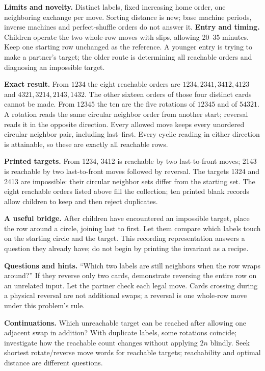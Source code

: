 \textbf{Limits and novelty.} Distinct labels, fixed increasing home order, one neighboring exchange per move. Sorting distance is new; base machine periods, inverse machines and perfect-shuffle orders do not answer it.
\newpage
{}
\textbf{Entry and timing.} Children operate the two whole-row moves with slips, allowing 20--35 minutes. Keep one starting row unchanged as the reference. A younger entry is trying to make a partner's target; the older route is determining all reachable orders and diagnosing an impossible target.

\textbf{Exact result.} From $1234$ the eight reachable orders are $1234,2341,3412,4123$ and $4321,3214,2143,1432$. The other sixteen orders of those four distinct cards cannot be made. From $12345$ the ten are the five rotations of $12345$ and of $54321$. A rotation reads the same circular neighbor order from another start; reversal reads it in the opposite direction. Every allowed move keeps every unordered circular neighbor pair, including last--first. Every cyclic reading in either direction is attainable, so these are exactly all reachable rows.

\textbf{Printed targets.} From 1234, 3412 is reachable by two last-to-front moves; 2143 is reachable by two last-to-front moves followed by reversal. The targets 1324 and 2413 are impossible: their circular neighbor sets differ from the starting set. The eight reachable orders listed above fill the collection; ten printed blank records allow children to keep and then reject duplicates.

\textbf{A useful bridge.} After children have encountered an impossible target, place the row around a circle, joining last to first. Let them compare which labels touch on the starting circle and the target. This recording representation answers a question they already have; do not begin by printing the invariant as a recipe.

\textbf{Questions and hints.} ``Which two labels are still neighbors when the row wraps around?'' If they reverse only two cards, demonstrate reversing the entire row on an unrelated input. Let the partner check each legal move. Cards crossing during a physical reversal are not additional swaps; a reversal is one whole-row move under this problem's rule.

\textbf{Continuations.} Which unreachable target can be reached after allowing one adjacent swap in addition? With duplicate labels, some rotations coincide; investigate how the reachable count changes without applying $2 n$ blindly. Seek shortest rotate/reverse move words for reachable targets; reachability and optimal distance are different questions.

